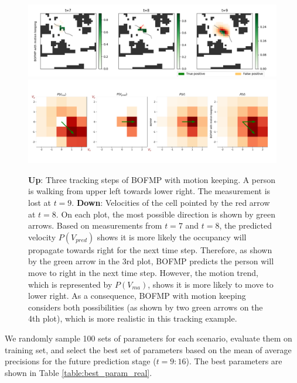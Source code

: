\begin{figure}[hp]
\centering
\includegraphics[width=\textwidth]{figures/moving_average_tracking.png}
\includegraphics[width=\textwidth]{figures/moving_average_tracking_velocities_1.png}
\caption[A tracking example of BOFMP with motion keeping.]{\textbf{Up}: Three tracking steps of BOFMP with motion keeping. A person is walking from upper left towards lower right. The measurement is lost at $t=9$. \textbf{Down}: Velocities of the cell pointed by the red arrow at $t=8$. On each plot, the most possible direction is shown by green arrows. Based on measurements from $t=7$ and $t=8$, the predicted velocity $P(V_{pred})$ shows it is more likely the occupancy will propagate towards right for the next time step. Therefore, as shown by the green arrow in the 3rd plot, BOFMP predicts the person will move to right in the next time step. However, the motion trend, which is represented by $P(V_{ma})$, shows it is more likely to move to lower right. As a consequence, BOFMP with motion keeping considers both possibilities (as shown by two green arrows on the 4th plot), which is more realistic in this tracking example.}
\label{fig:keep_motion_idea}
\end{figure}

We randomly sample 100 sets of parameters for each scenario, evaluate them on training set, and select the best set of parameters based on the mean of average precisions for the future prediction stage ($t=9:16$). The best parameters are shown in Table \ref{table:best_param_real}.

